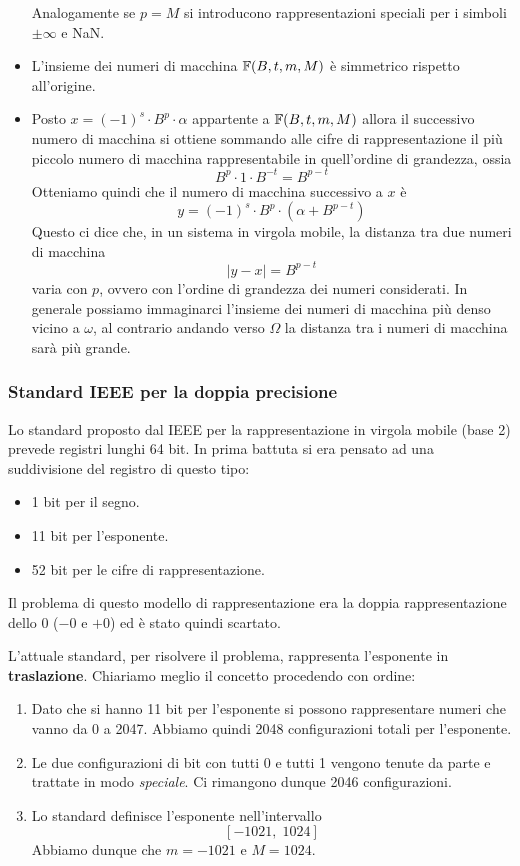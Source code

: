 \begin{observation}
\begin{itemize}
		      Analogamente se $p = M$ si introducono rappresentazioni speciali per i simboli $\pm \infty$
		      e NaN.
		\item L'insieme dei numeri di macchina $\mathbb{F} (B, t, m, M)$ è simmetrico rispetto all'origine.
		\item Posto $x = (-1)^s \cdot B^p \cdot \alpha$ appartente a $\mathbb{F}(B, t, m, M)$ allora il
		      successivo numero di macchina si ottiene sommando alle cifre di rappresentazione il più piccolo
		      numero di macchina rappresentabile in quell'ordine di grandezza, ossia
		      \[ B^p \cdot 1 \cdot B^{-t} = B^{p - t} \]
		      Otteniamo quindi che il numero di macchina successivo a $x$ è
		      \[ y = (-1)^s \cdot B^p \cdot (\alpha + B^{p-t}) \]
		      Questo ci dice che, in un sistema in virgola mobile, la distanza tra due numeri di macchina
		      \[ |y - x| = B^{p-t} \]
		      varia con $p$, ovvero con l'ordine di grandezza dei numeri considerati. In generale possiamo
		      immaginarci l'insieme dei numeri di macchina più denso vicino a $\omega$, al contrario andando
		      verso $\Omega$ la distanza tra i numeri di macchina sarà più grande.
	\end{itemize}
\end{observation}

\subsubsection{Standard IEEE per la doppia precisione}
Lo standard proposto dal IEEE per la rappresentazione in virgola mobile (base 2) prevede registri lunghi 64 bit.
In prima battuta si era pensato ad una suddivisione del registro di questo tipo:
\begin{itemize}
	\item 1 bit per il segno.
	\item 11 bit per l'esponente.
	\item 52 bit per le cifre di rappresentazione.
\end{itemize}
Il problema di questo modello di rappresentazione era la doppia rappresentazione dello 0 ($-0$ e $+0$) ed è stato
quindi scartato.

L'attuale standard, per risolvere il problema, rappresenta l'esponente in \textbf{traslazione}. Chiariamo meglio
il concetto procedendo con ordine:
\begin{enumerate}
	\item Dato che si hanno 11 bit per l'esponente si possono rappresentare numeri che vanno da 0 a 2047. Abbiamo
	      quindi 2048 configurazioni totali per l'esponente.
	\item Le due configurazioni di bit con tutti 0 e tutti 1 vengono tenute da parte e trattate in modo
	      \emph{speciale}. Ci rimangono dunque 2046 configurazioni.
	\item Lo standard definisce l'esponente nell'intervallo
	      \[ [ -1021, \; 1024 ] \]
	      Abbiamo dunque che $m = -1021$ e $M = 1024$.
\end{enumerate}
